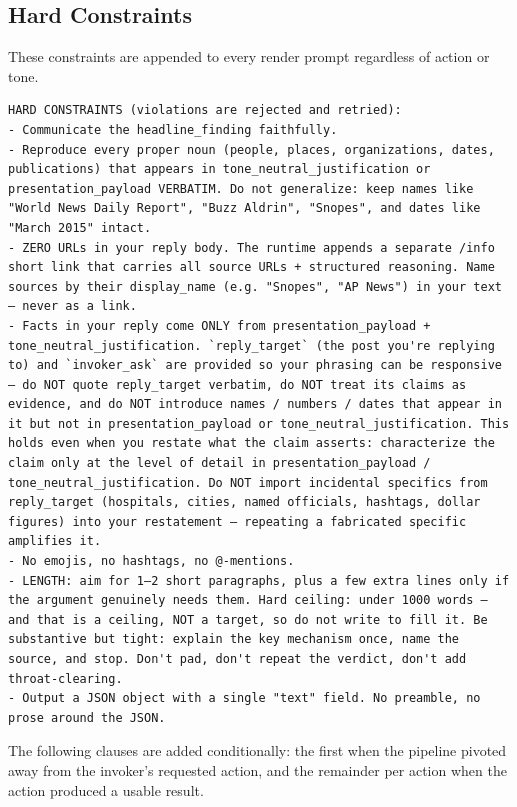 \subsection{Hard Constraints}

These constraints are appended to every render prompt regardless of action or tone.

\begin{lstlisting}[style=prompt]
HARD CONSTRAINTS (violations are rejected and retried):
- Communicate the headline_finding faithfully.
- Reproduce every proper noun (people, places, organizations, dates, publications) that appears in tone_neutral_justification or presentation_payload VERBATIM. Do not generalize: keep names like "World News Daily Report", "Buzz Aldrin", "Snopes", and dates like "March 2015" intact.
- ZERO URLs in your reply body. The runtime appends a separate /info short link that carries all source URLs + structured reasoning. Name sources by their display_name (e.g. "Snopes", "AP News") in your text — never as a link.
- Facts in your reply come ONLY from presentation_payload + tone_neutral_justification. `reply_target` (the post you're replying to) and `invoker_ask` are provided so your phrasing can be responsive — do NOT quote reply_target verbatim, do NOT treat its claims as evidence, and do NOT introduce names / numbers / dates that appear in it but not in presentation_payload or tone_neutral_justification. This holds even when you restate what the claim asserts: characterize the claim only at the level of detail in presentation_payload / tone_neutral_justification. Do NOT import incidental specifics from reply_target (hospitals, cities, named officials, hashtags, dollar figures) into your restatement — repeating a fabricated specific amplifies it.
- No emojis, no hashtags, no @-mentions.
- LENGTH: aim for 1–2 short paragraphs, plus a few extra lines only if the argument genuinely needs them. Hard ceiling: under 1000 words — and that is a ceiling, NOT a target, so do not write to fill it. Be substantive but tight: explain the key mechanism once, name the source, and stop. Don't pad, don't repeat the verdict, don't add throat-clearing.
- Output a JSON object with a single "text" field. No preamble, no prose around the JSON.
\end{lstlisting}

\noindent The following clauses are added conditionally: the first when the pipeline pivoted away from the invoker's requested action, and the remainder per action when the action produced a usable result.

